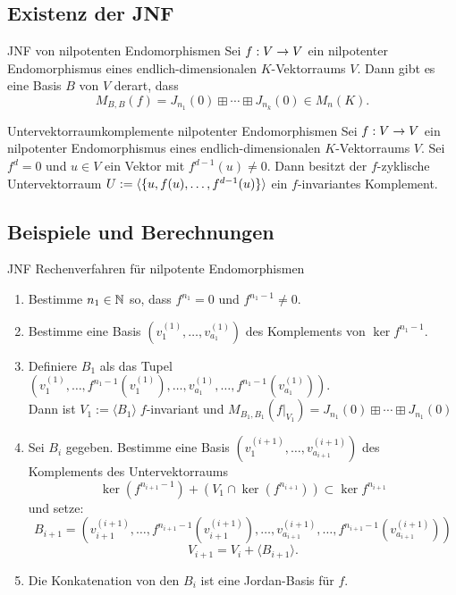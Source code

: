 \documentclass[main.tex]{subfiles}
\begin{document}
\subsection*{Existenz der JNF}

\begin{karte}{JNF von nilpotenten Endomorphismen}
    Sei \(f : V \rightarrow V\) ein nilpotenter Endomorphismus eines endlich-dimensionalen
    \(K\)-Vektorraums \(V\). Dann gibt es eine Basis \(B\) von \(V\) derart, dass
    \[ M_{B,B}(f) = J_{n_1}(0) \boxplus \cdots \boxplus J_{n_k}(0) \in M_n(K). \]
\end{karte}

\begin{karte}{Untervektorraumkomplemente nilpotenter Endomorphismen}
    Sei \(f : V \rightarrow V\) ein nilpotenter Endomorphismus eines endlich-dimensionalen
    \(K\)-Vektorraums \(V\). Sei \(f^d = 0\) und \(u \in V\) ein Vektor mit
    \(f^{d-1}(u) \neq 0\). Dann besitzt der \(f\)-zyklische Untervektorraum
    \(U := \langle \{u, f(u), \ldots, f^{d-1}(u)\}\rangle\) ein \(f\)-invariantes
    Komplement.
\end{karte}

\subsection*{Beispiele und Berechnungen}

\begin{karte}{JNF Rechenverfahren für nilpotente Endomorphismen}
    \begin{enumerate}
        \item Bestimme \(n_1 \in \mathbb{N}\) so, dass \(f^{n_1} = 0 \) und
        \(f^{n_1-1} \neq 0\).
        \item Bestimme eine Basis \((v^{(1)}_1,\ldots,v^{(1)}_{a_1})\)
        des Komplements von \(\ker f^{n_1-1}\).
        \item Definiere \(B_1\) als das Tupel\\
        \( \left(v_1^{(1)}, \ldots, f^{n_1-1}\left(v_1^{(1)}\right), \ldots,
        v_{a_1}^{(1)}, \ldots, f^{n_1-1}\left(v_{a_1}^{(1)}\right)\right) \).\\
        Dann ist \(V_1:=\langle B_1 \rangle \; f\)-invariant und
        \( M_{B_1,B_1}(f\vert_{V_1}) = J_{n_1}(0) \boxplus \cdots \boxplus J_{n_1}(0) \)
        \item Sei \(B_i\) gegeben. Bestimme eine Basis \((v_1^{(i+1)},\ldots, v_{a_{i+1}}^{(i+1)})\)
        des Komplements des Untervektorraums
        \[ \ker(f^{n_{i+1}-1}) + (V_1 \cap \ker(f^{n_{i+1}})) \subset \ker f^{n_{i+1}} \]
        und setze:
        \[ B_{i+1} = \left(v_{i+1}^{(i+1)}, \ldots, f^{n_{i+1}-1}\left(v_{i+1}^{(i+1)}\right), \ldots,
        v_{a_{i+1}}^{(i+1)}, \ldots, f^{n_{i+1}-1}\left(v_{a_{i+1}}^{(i+1)}\right)\right) \]
        \[ V_{i+1} = V_i + \langle B_{i+1} \rangle. \]
        \item Die Konkatenation von den \(B_i\) ist eine Jordan-Basis für \(f\).
    \end{enumerate}    
\end{karte}
\end{document}
